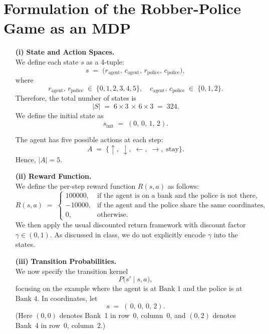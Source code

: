 \section*{Formulation of the Robber-Police Game as an MDP}

\begin{enumerate}

  \item[\textbf{(i)}]
    \textbf{State and Action Spaces.} \\
    We define each state \(s\) as a 4-tuple:
    \[
      s \;=\; \bigl(r_{\text{agent}},\,c_{\text{agent}},\,r_{\text{police}},\,c_{\text{police}}\bigr),
    \]
    where
    \[
      r_{\text{agent}},\,r_{\text{police}} \;\in\;\{0,1,2,3,4,5\},
      \quad
      c_{\text{agent}},\,c_{\text{police}} \;\in\;\{0,1,2\}.
    \]
    Therefore, the total number of states is
    \[
      |S| \;=\; 6 \times 3 \,\times\, 6 \times 3 \;=\; 324.
    \]
    We define the initial state as
    \[
      s_{\text{init}} \;=\; (0,\,0,\,1,\,2).
    \]

    The agent has five possible actions at each step:
    \[
      A \;=\; \{\uparrow,\;\downarrow,\;\leftarrow,\;\rightarrow,\;\text{stay}\}.
    \]
    Hence, \(\lvert A \rvert = 5\).

  \item[\textbf{(ii)}]
    \textbf{Reward Function.} \\
    We define the per-step reward function \(R(s,a)\) as follows:
    \[
      R(s, a) \;=\;
      \begin{cases}
        100000, & \text{if the agent is on a bank and the police is not there,} \\
        -10000, & \text{if the agent and the police share the same coordinates,} \\
        0, & \text{otherwise.}
      \end{cases}
    \]
    We then apply the usual discounted return framework with discount factor
    \(\gamma \in (0,1)\).  As discussed in class, we do not explicitly encode \(\gamma\) into the states.

  \item[\textbf{(iii)}]
    \textbf{Transition Probabilities.} \\
    We now specify the transition kernel
    \[
      P\bigl(s' \mid s, a\bigr),
    \]
    focusing on the example where the agent is at \(\text{Bank 1}\) and the police is at \(\text{Bank 4}\).  In coordinates, let
    \[
      s \;=\; (\,0,\,0,\,0,\,2).
    \]
    (Here \((0,0)\) denotes Bank~1 in row~0, column~0, and \((0,2)\) denotes Bank~4 in row~0, column~2.)


\end{enumerate}
